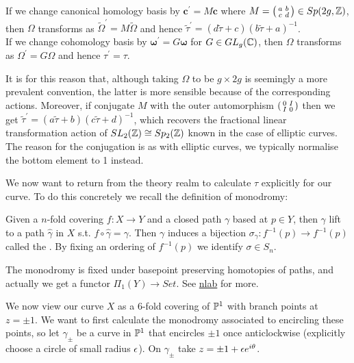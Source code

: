 \documentclass{article}
\begin{document}
\begin{lemma}
	If we change canonical homology basis by $\bm{c}^\prime = M \bm{c}$ where $M = \begin{psmallmatrix} a & b \\ c & d \end{psmallmatrix} \in Sp(2g,\mathbb{Z})$, then $\Omega$ transforms as $\tilde{\Omega}^\prime = M\tilde{\Omega}$ and hence $\tilde{\tau}^\prime = (d\tilde{\tau}+c)(b\tilde{\tau}+a)^{-1}$. \\
	If we change cohomology basis by $\bm{\omega}^\prime = G \bm{\omega}$ for $G \in GL_g(\mathbb{C})$, then $\Omega$ transforms as $\Omega^\prime = G\Omega$ and hence $\tau^\prime = \tau$.   
\end{lemma}
\begin{remark}
	It is for this reason that, although taking $\Omega$ to be $g \times 2g$ is seemingly a more prevalent convention, the latter is more sensible because of the corresponding actions. Moreover, if conjugate $M$ with the outer automorphism $\begin{psmallmatrix} 0 & I \\ I & 0 \end{psmallmatrix}$ then we get $\tilde{\tau}^\prime = (a\tilde{\tau}+b)(c\tilde{\tau}+d)^{-1}$, which recovers the fractional linear transformation action of $SL_2(\mathbb{Z}) \cong Sp_2(\mathbb{Z})$ known in the case of elliptic curves. The reason for the conjugation is as with elliptic curves, we typically normalise the bottom element to 1 instead. 
\end{remark}
We now want to return from the theory realm to calculate $\tau$ explicitly for our curve. To do this concretely we recall the definition of monodromy: 
\begin{definition}
	Given a $n$-fold covering $f:X \to Y$ and a closed path $\gamma$ based at $p \in Y$, then $\gamma$ lift to a path $\hat{\gamma}$ in $X$ s.t. $f \circ \hat{\gamma}=\gamma$. Then $\gamma$ induces a bijection $\sigma_\gamma : f^{-1}(p) \to f^{-1}(p)$ called the . By fixing an ordering of $f^{-1}(p)$ we identify $\sigma \in S_n$.  
\end{definition}
\begin{remark}
The monodromy is fixed under basepoint preserving homotopies of paths, and actually we get a functor $\Pi_1(Y) \to Set$. See \href{https://ncatlab.org/nlab/show/monodromy}{nlab} for more. 
\end{remark}
We now view our curve $X$ as a 6-fold covering of $\mathbb{P}^1$ with branch points at $z=\pm 1$. We want to first calculate the monodromy associated to encircling these points, so let $\gamma_\pm$ be a curve in $\mathbb{P}^1$ that encircles $\pm 1$ once anticlockwise (explicitly choose a circle of small radius $\epsilon$). On $\gamma_\pm$ take $z = \pm1 + \epsilon e^{i\theta}$. \\
\end{document}
